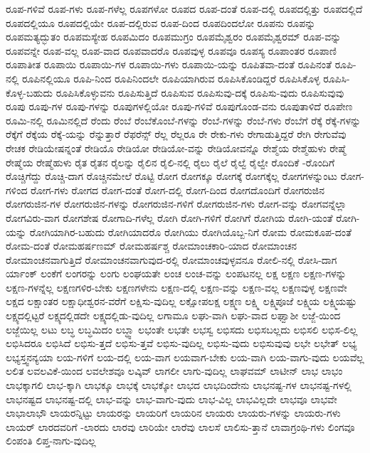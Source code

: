 {ರೂಪ-ಗಳಿವೆ
ರೂಪ-ಗಳು
ರೂಪ-ಗಳೆಲ್ಲ
ರೂಪಗಳೋ
ರೂಪದ
ರೂಪ-ದಂತೆ
ರೂಪ-ದಲ್ಲಿ
ರೂಪದಲ್ಲಿತ್ತು
ರೂಪದಲ್ಲಿದೆ
ರೂಪದಲ್ಲಿಯೂ
ರೂಪದಲ್ಲಿಯೇ
ರೂಪ-ದಲ್ಲಿರುವ
ರೂಪ-ದಿಂದ
ರೂಪದಿಂದಲೋ
ರೂಪನು
ರೂಪನ್ನು
ರೂಪಮತ್ಯದ್ಭುತಂ
ರೂಪಮಸ್ಯೇಹ
ರೂಪಮಿದಂ
ರೂಪಮುಗ್ರಂ
ರೂಪಮೈಶ್ವರಂ
ರೂಪಮೈಶ್ವರಮ್
ರೂಪ-ವನ್ನು
ರೂಪವನ್ನೇ
ರೂಪ-ವಲ್ಲ
ರೂಪ-ವಾದ
ರೂಪವಾದರೊ
ರೂಪವುಳ್ಳ
ರೂಪವೂ
ರೂಪಸ್ಯ
ರೂಪಾಂತರ
ರೂಪಾಣಿ
ರೂಪಾತೀತ
ರೂಪಾಯಿ
ರೂಪಾಯಿ-ಗಳ
ರೂಪಾಯಿ-ಗಳು
ರೂಪಾಯಿ-ಯನ್ನು
ರೂಪಿತವಾ-ದಂತೆ
ರೂಪಿನಂತೆ
ರೂಪಿ-ನಲ್ಲಿ
ರೂಪಿನಲ್ಲಿಯೂ
ರೂಪಿ-ನಿಂದ
ರೂಪಿನಿಂದಲೇ
ರೂಪಿಯಾಗಿರುವ
ರೂಪಿಸಿಕೊಂಡಿದ್ದರೆ
ರೂಪಿಸಿಕೊಳ್ಳ
ರೂಪಿಸಿ-ಕೊಳ್ಳ-ಬಹುದು
ರೂಪಿಸಿಕೊಳ್ಳುವನು
ರೂಪಿಸುತ್ತಿದೆ
ರೂಪಿಸುವ
ರೂಪಿಸುವು-ದಕ್ಕೆ
ರೂಪಿಸು-ವುದು
ರೂಪಿಸುವುವು
ರೂಪು
ರೂಪು-ಗಳ
ರೂಪು-ಗಳನ್ನು
ರೂಪುಗಳಲ್ಲಿಯೋ
ರೂಪು-ಗಳಿವೆ
ರೂಪುಗೊಂಡ-ವನು
ರೂಪುತಾಳಿದೆ
ರೂಪೇಣ
ರೂಮಿ-ನಲ್ಲಿ
ರೂಮಿನಲ್ಲಿದೆ
ರೆಂದು
ರೆಂಬೆ
ರೆಂಬೆಕೊಂಬೆ-ಗಳನ್ನು
ರೆಂಬೆ-ಗಳನ್ನು
ರೆಂಬೆ-ಗಳು
ರೆಂಬೆಗೆ
ರೆಕ್ಕೆ
ರೆಕ್ಕೆ-ಗಳನ್ನು
ರೆಕ್ಕೆಗೆ
ರೆಕ್ಕೆಯ
ರೆಕ್ಕೆ-ಯನ್ನು
ರೆನ್ನುತ್ತಾರೆ
ರೆಫರೆನ್ಸ್
ರೆಲ್ಲ
ರೆಲ್ಲರೂ
ರೇ
ರೇಕು-ಗಳು
ರೇಗಾಡುತ್ತಿದ್ದರೆ
ರೇಗಿ
ರೇಗುವೆವು
ರೇಚಕ
ರೇಡಿಯೇಷನ್ನಂತೆ
ರೇಡಿಯೊ
ರೇಡಿಯೋ
ರೇಡಿಯೋ-ವನ್ನು
ರೇಡಿಯೋವನ್ನೊ
ರೇಶ್ಮೆಯ
ರೇಶ್ಮೆಹುಳು
ರೇಷ್ಮೆ
ರೇಷ್ಮೆಯ
ರೇಷ್ಮೆಹುಳು
ರೈತ
ರೈತನ
ರೈಲನ್ನು
ರೈಲಿನ
ರೈಲಿ-ನಲ್ಲಿ
ರೈಲು
ರೈಲೆ
ರೈಲ್ವೆ
ರೈಲ್ವೇ
ರೊಂದಿಕೆ
-ರೊಂದಿಗೆ
ರೊಚ್ಚಿಗೆದ್ದು
ರೊಚ್ಚಿ-ದಾಗ
ರೊಚ್ಚಿನಮೇಲೆ
ರೊಟ್ಟಿ
ರೋಗ
ರೋಗಕ್ಕೂ
ರೋಗಕ್ಕೆ
ರೋಗಕ್ಕೆಲ್ಲ
ರೋಗಗಳನ್ನುಂಟು
ರೋಗ-ಗಳಿಂದ
ರೋಗ-ಗಳು
ರೋಗದ
ರೋಗ-ದಂತೆ
ರೋಗ-ದಲ್ಲಿ
ರೋಗ-ದಿಂದ
ರೋಗದೊಂದಿಗೆ
ರೋಗರುಜಿನ
ರೋಗರುಜಿನ-ಗಳ
ರೋಗರುಜಿನ-ಗಳನ್ನು
ರೋಗರುಜಿನ-ಗಳಿಗೆ
ರೋಗರುಜಿನ-ಗಳು
ರೋಗ-ವನ್ನು
ರೋಗವನ್ನೆಲ್ಲಾ
ರೋಗವಿರು-ವಾಗ
ರೋಗಶೇಷ
ರೋಗಾದಿ-ಗಳೆಲ್ಲ
ರೋಗಿ
ರೋಗಿ-ಗಳಿಗೆ
ರೋಗಿಗೆ
ರೋಗಿಯ
ರೋಗಿ-ಯಂತೆ
ರೋಗಿ-ಯನ್ನು
ರೋಗಿಯಾಗಿರ-ಬಹುದು
ರೋಗಿಯಾದರೊ
ರೋಗಿಯು
ರೋಗಿಯೊಬ್ಬ-ನಿಗೆ
ರೋಮ
ರೋಮಕೂಪ-ದಂತೆ
ರೋಮ-ದಂತೆ
ರೋಮಹರ್ಷಣಮ್
ರೋಮಹರ್ಷಶ್ಚ
ರೋಮಾಂಚಕಾರಿ-ಯಾದ
ರೋಮಾಂಚನ
ರೋಮಾಂಚನವಾಗುತ್ತಿದೆ
ರೋಮಾಂಚನವಾಗುವುದ-ರಲ್ಲಿ
ರೋಮಾಂಚವುಳ್ಳವನೂ
ರೋಲಿ-ನಲ್ಲಿ
ರೋಸಿ-ದಾಗ
ರ್ಯಾಂಕ್
ಲಂಕೆಗೆ
ಲಂಗರನ್ನು
ಲಂಗು
ಲಂಘಯತೇ
ಲಂಚ
ಲಂಚ-ವನ್ನು
ಲಂಪಟನಲ್ಲ
ಲಕ್ಷ
ಲಕ್ಷಣ
ಲಕ್ಷಣ-ಗಳನ್ನು
ಲಕ್ಷಣ-ಗಳನ್ನೆಲ್ಲ
ಲಕ್ಷಣಗಳಿರ-ಬೇಕು
ಲಕ್ಷಣಗಳೇನು
ಲಕ್ಷಣ-ದಲ್ಲಿ
ಲಕ್ಷಣ-ವನ್ನು
ಲಕ್ಷಣ-ವಲ್ಲ
ಲಕ್ಷಣವುಳ್ಳ
ಲಕ್ಷಣವೇ
ಲಕ್ಷದ
ಲಕ್ಷಾಂತರ
ಲಕ್ಷಾಧೀಶ್ವರನ-ವರೆಗೆ
ಲಕ್ಷಿಸು-ವುದಿಲ್ಲ
ಲಕ್ಷೋಪಲಕ್ಷ
ಲಕ್ಷ್ಮಣ
ಲಕ್ಷ್ಮಿ
ಲಕ್ಷ್ಮಿಪೂಜೆ
ಲಕ್ಷ್ಮಿಯ
ಲಕ್ಷ್ಮಿಯಷ್ಟು
ಲಕ್ಷ್ಯದಲ್ಲಿಟ್ಟರೆ
ಲಕ್ಷ್ಯದಲ್ಲಿಡದೇ
ಲಕ್ಷ್ಯದಲ್ಲಿಡು-ವುದಿಲ್ಲ
ಲಗಾಮೂ
ಲಘು-ವಾಗಿ
ಲಘು-ವಾದ
ಲಘ್ವಾಶೀ
ಲಜ್ಜೆ-ಯಿಂದ
ಲಜ್ಜೆಯಿಲ್ಲ
ಲಟು
ಲಬ್ಧ
ಲಬ್ಧಮಿದಂ
ಲಬ್ಧ್ವಾ
ಲಭಂತೇ
ಲಭತೇ
ಲಭಸ್ವ
ಲಭಿಸದು
ಲಭಿಸಬಲ್ಲದು
ಲಭಿಸಲಿ
ಲಭಿಸ-ಲಿಲ್ಲ
ಲಭಿಸಿದರೂ
ಲಭಿಸಿದೆ
ಲಭಿಸು-ತ್ತದೆ
ಲಭಿಸು-ತ್ತವೆ
ಲಭಿಸು-ವುದಿಲ್ಲ
ಲಭಿಸು-ವುದು
ಲಭಿಸುವುವು
ಲಭೇ
ಲಭೇತ್
ಲಭ್ಯ
ಲಭ್ಯಸ್ತ್ವನನ್ಯಯಾ
ಲಯ-ಗಳಿಗೆ
ಲಯ-ದಲ್ಲಿ
ಲಯ-ವಾಗ
ಲಯವಾಗ-ಬೇಕು
ಲಯ-ವಾಗಿ
ಲಯ-ವಾಗು-ವುದು
ಲಯವೆಲ್ಲ
ಲಲಿತ
ಲವಲವಿಕೆ-ಯಿಂದ
ಲವಲೇಶವೂ
ಲವ್ಕಿವ್
ಲಾಗಲೀ
ಲಾಗು-ವುದಿಲ್ಲ
ಲಾಘವಮ್
ಲಾಟೀನ್
ಲಾಭ
ಲಾಭಂ
ಲಾಭಕ್ಕಾಗಲಿ
ಲಾಭ-ಕ್ಕಾಗಿ
ಲಾಭಕ್ಕೂ
ಲಾಭಕ್ಕೆ
ಲಾಭಕ್ಕೋ
ಲಾಭದ
ಲಾಭದಿಂದೇನು
ಲಾಭನಷ್ಟ-ಗಳ
ಲಾಭನಷ್ಟ-ಗಳಲ್ಲಿ
ಲಾಭನಷ್ಟದ
ಲಾಭನಷ್ಟ-ದಲ್ಲಿ
ಲಾಭ-ವನ್ನು
ಲಾಭ-ವಾಗು-ವುದು
ಲಾಭ-ವಿಲ್ಲ
ಲಾಭವಿಲ್ಲದೇ
ಲಾಭವೂ
ಲಾಭವೇ
ಲಾಭಾಲಾಭೌ
ಲಾಯರನ್ನಿಟ್ಟು
ಲಾಯರನ್ನು
ಲಾಯರಿಗೆ
ಲಾಯರಿನ
ಲಾಯರು
ಲಾಯರು-ಗಳನ್ನು
ಲಾಯರು-ಗಳು
ಲಾಯರ್
ಲಾರದವರಿಗೆ
-ಲಾರದು
ಲಾರವು
ಲಾರಿಯೇ
ಲಾರೆವು
ಲಾಲಸೆ
ಲಾಲಿಸು-ತ್ತಾನೆ
ಲಾವಾಗ್ರಂಥಿ-ಗಳು
ಲಿಂಗವೂ
ಲಿಂಪಂತಿ
ಲಿಪ್ತ-ನಾಗು-ವುದಿಲ್ಲ
}
